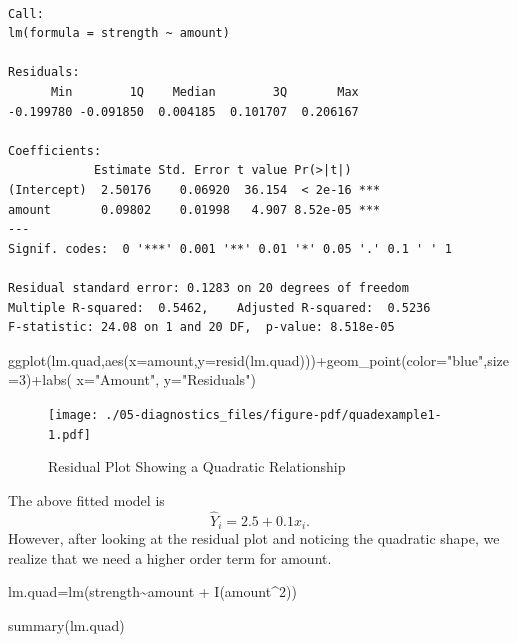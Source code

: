 \documentclass[
  letterpaper,
  DIV=11,
  numbers=noendperiod]{scrreprt}
\newenvironment{Shaded}{\begin{snugshade}}{\end{snugshade}}
\newcommand{\AttributeTok}[1]{\textcolor[rgb]{0.40,0.45,0.13}{#1}}
\newcommand{\DecValTok}[1]{\textcolor[rgb]{0.68,0.00,0.00}{#1}}
\newcommand{\FunctionTok}[1]{\textcolor[rgb]{0.28,0.35,0.67}{#1}}
\newcommand{\NormalTok}[1]{\textcolor[rgb]{0.00,0.23,0.31}{#1}}
\newcommand{\OtherTok}[1]{\textcolor[rgb]{0.00,0.23,0.31}{#1}}
\newcommand{\SpecialCharTok}[1]{\textcolor[rgb]{0.37,0.37,0.37}{#1}}
\newcommand{\StringTok}[1]{\textcolor[rgb]{0.13,0.47,0.30}{#1}}
\begin{document}
\begin{verbatim}

Call:
lm(formula = strength ~ amount)

Residuals:
      Min        1Q    Median        3Q       Max 
-0.199780 -0.091850  0.004185  0.101707  0.206167 

Coefficients:
            Estimate Std. Error t value Pr(>|t|)    
(Intercept)  2.50176    0.06920  36.154  < 2e-16 ***
amount       0.09802    0.01998   4.907 8.52e-05 ***
---
Signif. codes:  0 '***' 0.001 '**' 0.01 '*' 0.05 '.' 0.1 ' ' 1

Residual standard error: 0.1283 on 20 degrees of freedom
Multiple R-squared:  0.5462,    Adjusted R-squared:  0.5236 
F-statistic: 24.08 on 1 and 20 DF,  p-value: 8.518e-05
\end{verbatim}

\begin{Shaded}
\begin{Highlighting}[]
 \FunctionTok{ggplot}\NormalTok{(lm.quad,}\FunctionTok{aes}\NormalTok{(}\AttributeTok{x=}\NormalTok{amount,}\AttributeTok{y=}\FunctionTok{resid}\NormalTok{(lm.quad)))}\SpecialCharTok{+}\FunctionTok{geom\_point}\NormalTok{(}\AttributeTok{color=}\StringTok{"blue"}\NormalTok{,}\AttributeTok{size=}\DecValTok{3}\NormalTok{)}\SpecialCharTok{+}\FunctionTok{labs}\NormalTok{( }\AttributeTok{x=}\StringTok{"Amount"}\NormalTok{, }\AttributeTok{y=}\StringTok{"Residuals"}\NormalTok{)}
\end{Highlighting}
\end{Shaded}

\begin{figure}[H]

{\centering \texttt{[image: ./05-diagnostics\_files/figure-pdf/quadexample1-1.pdf]}

}

\caption{Residual Plot Showing a Quadratic Relationship}

\end{figure}

The above fitted model is \[\hat{Y}_{i} = 2.5 + 0.1x_{i}.\] However,
after looking at the residual plot and noticing the quadratic shape, we
realize that we need a higher order term for amount.

\begin{Shaded}
\begin{Highlighting}[]
\NormalTok{lm.quad}\OtherTok{=}\FunctionTok{lm}\NormalTok{(strength}\SpecialCharTok{\textasciitilde{}}\NormalTok{amount }\SpecialCharTok{+} \FunctionTok{I}\NormalTok{(amount}\SpecialCharTok{\^{}}\DecValTok{2}\NormalTok{))}

\FunctionTok{summary}\NormalTok{(lm.quad)}
\end{Highlighting}
\end{Shaded}
\end{document}

